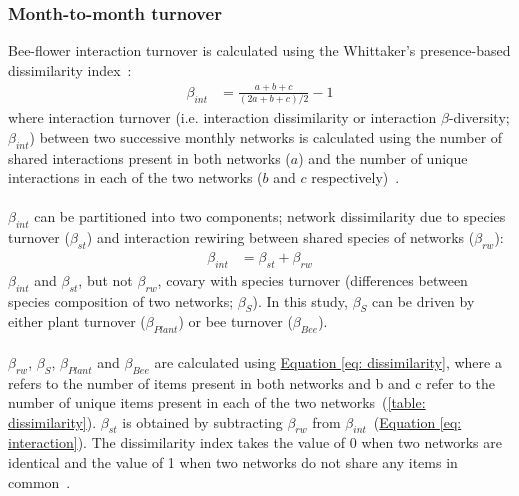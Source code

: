 \documentclass[11pt]{article}
\begin{document}
\subsubsection{Month-to-month turnover}
Bee-flower interaction turnover is calculated using the Whittaker's presence-based dissimilarity index~\citep{Whittaker1960}: 
\begin{align}
	\beta_{int} & = \frac{a + b + c}{(2a + b + c)/2} - 1 
\label{eq: dissimilarity}
\end{align}
where interaction turnover (i.e. interaction dissimilarity or interaction $\beta$-diversity; $\beta_{int}$) between two successive monthly networks is calculated using the number of shared interactions present in both networks ($a$) and the number of unique interactions in each of the two networks ($b$ and $c$ respectively)~\citep{Poisot2012}. \\
\\
$\beta_{int}$ can be partitioned into two components; network dissimilarity due to species turnover ($\beta_{st}$) and interaction rewiring between shared species of networks ($\beta_{rw}$):
\begin{align}
	\beta_{int} & = \beta_{st} + \beta_{rw} 
\label{eq: interaction}
\end{align}
$\beta_{int}$ and $\beta_{st}$, but not $\beta_{rw}$, covary with species turnover (differences between species composition of two networks; $\beta_{S}$). In this study, $\beta_{S}$ can be driven by either plant turnover ($\beta_{Plant}$) or bee turnover ($\beta_{Bee}$). \\
\\
$\beta_{rw}$, $\beta_{S}$, $\beta_{Plant}$ and $\beta_{Bee}$ are calculated using \hyperref[eq: dissimilarity]{Equation \ref{eq: dissimilarity}}, where a refers to the number of items present in both networks and b and c refer to the number of unique items present in each of the two networks~(\autoref{table: dissimilarity}). $\beta_{st}$ is obtained by subtracting $\beta_{rw}$ from $\beta_{int}$~(\hyperref[eq: interaction]{Equation \ref{eq: interaction}}). The dissimilarity index takes the value of 0 when two networks are identical and the value of 1 when two networks do not share any items in common~\citep{Poisot2012, CaraDonna2017}. \\
\end{document}
